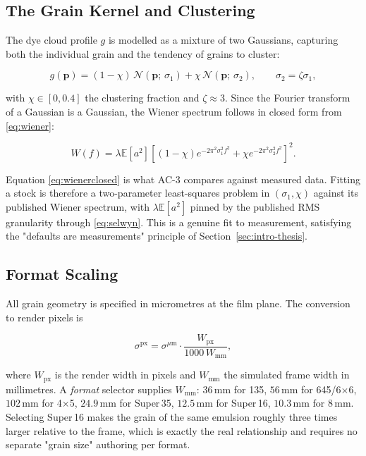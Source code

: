 \subsection{The Grain Kernel and Clustering}

The dye cloud profile $g$ is modelled as a mixture of two Gaussians, capturing
both the individual grain and the tendency of grains to cluster:

\begin{equation}
g(\mathbf{p}) = (1-\chi)\, \mathcal{N}(\mathbf{p};\, \sigma_1) + \chi\, \mathcal{N}(\mathbf{p};\, \sigma_2),
\qquad \sigma_2 = \zeta \sigma_1,
\label{eq:grainkernel}
\end{equation}

with $\chi \in [0, 0.4]$ the clustering fraction and $\zeta \approx 3$. Since the
Fourier transform of a Gaussian is a Gaussian, the Wiener spectrum follows in
closed form from \eqref{eq:wiener}:

\begin{equation}
W(f) = \lambda \mathbb{E}[a^2]\left[(1-\chi)e^{-2\pi^2\sigma_1^2 f^2} + \chi e^{-2\pi^2\sigma_2^2 f^2}\right]^2 .
\label{eq:wienerclosed}
\end{equation}

Equation \eqref{eq:wienerclosed} is what AC-3 compares against measured
data. Fitting a stock is therefore a two-parameter least-squares problem in
$(\sigma_1, \chi)$ against its published Wiener spectrum, with $\lambda
\mathbb{E}[a^2]$ pinned by the published RMS granularity through
\eqref{eq:selwyn}. This is a genuine fit to measurement, satisfying the
"defaults are measurements" principle of Section~\ref{sec:intro-thesis}.

\subsection{Format Scaling}
\label{sec:formatscale}

All grain geometry is specified in micrometres at the film plane. The
conversion to render pixels is

\begin{equation}
\sigma^{\mathrm{px}} = \sigma^{\mu\mathrm{m}} \cdot \frac{W_{\mathrm{px}}}{1000\, W_{\mathrm{mm}}},
\label{eq:formatscale}
\end{equation}

where $W_{\mathrm{px}}$ is the render width in pixels and $W_{\mathrm{mm}}$ the
simulated frame width in millimetres. A \emph{format} selector supplies
$W_{\mathrm{mm}}$: $36$\,mm for 135, $56$\,mm for 645/6$\times$6, $102$\,mm for
4$\times$5, $24.9$\,mm for Super\,35, $12.5$\,mm for Super\,16, $10.3$\,mm for
8\,mm. Selecting Super\,16 makes the grain of the same emulsion roughly three
times larger relative to the frame, which is exactly the real relationship and
requires no separate "grain size" authoring per format.

